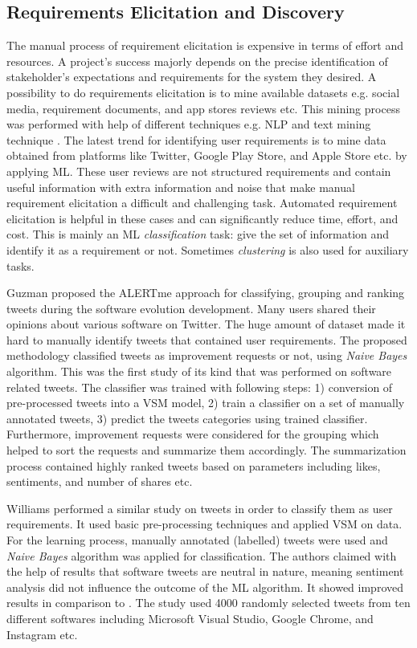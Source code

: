 \subsection{Requirements Elicitation and Discovery}

The manual process of requirement elicitation is expensive in terms of
effort and resources. A project's success majorly depends
on the precise identification of stakeholder's expectations and requirements for
the system they desired. A possibility to do requirements elicitation is to mine available datasets e.g.
social media, requirement documents, and app stores reviews etc. This mining process was performed with help of different techniques e.g. NLP and text mining technique \cite{Hollis2017}\cite{dong2010}. The latest trend for
identifying user requirements is to mine data obtained from platforms like Twitter,
Google Play Store, and Apple Store etc. by applying ML. These user reviews are not structured requirements
and contain useful information with extra information and noise that make manual requirement elicitation a difficult and challenging task.
Automated requirement elicitation is helpful in these cases and can
significantly reduce time, effort, and cost. This is mainly an ML
\emph{classification} task: give the set of information and identify it as a
requirement or not. Sometimes \emph{clustering} is also used for auxiliary 
tasks.

	Guzman \etal \cite{Guzman:2017} proposed the ALERTme approach for
classifying, grouping and ranking tweets during the software
evolution development. Many users shared their opinions about various software on Twitter. The huge amount of dataset made it hard to manually identify tweets that contained user requirements. The proposed methodology classified tweets as improvement requests or not, using \emph{Naive Bayes} algorithm. This was the first study of
its kind that was performed on software related tweets. 
The classifier was trained with following steps: 1) conversion of
pre-processed tweets into a VSM model, 2) train a classifier
on a set of manually annotated tweets, 3) predict the tweets categories using trained classifier. Furthermore, improvement
requests were considered for the grouping which helped to sort the
requests and summarize them accordingly. The summarization process contained highly ranked tweets based on parameters including likes, sentiments, and number of shares etc.

	Williams \etal \cite{Williams:2017} performed a similar study on tweets in order
to classify them as user requirements. It used basic pre-processing techniques and applied VSM on data. For the learning
process, manually annotated (labelled) tweets were used and \emph{Naive Bayes} algorithm was applied for classification. The authors claimed with the help of results that
software tweets are neutral in nature, meaning sentiment analysis did not
influence the outcome of the ML algorithm. It showed improved results in comparison to \cite{Guzman:2017}.
The study used 4000 randomly selected tweets from ten different
softwares including Microsoft Visual Studio, Google Chrome, and Instagram etc.

